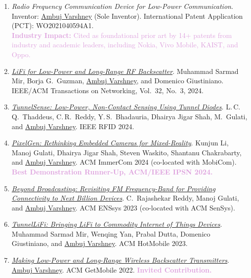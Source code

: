 \begin{enumerate}[itemsep=1.2em, topsep=0.6em]
\item
\emph{Radio Frequency Communication Device for Low-Power Communication}.
Inventor: \underline{Ambuj Varshney} (Sole Inventor).
\textcolor{accent}{International Patent Application (PCT): WO2021040594A1}.\\
\textcolor{plum}{\textbf{Industry Impact:} Cited as foundational prior art by 14+ patents from industry and academic leaders, including Nokia, Vivo Mobile, KAIST, and Oppo.}

\item
\emph{\href{https://doi.org/10.1109/TNET.2023.3344316}{LiFi for Low-Power and Long-Range RF Backscatter}}.
Muhammad Sarmad Mir, Borja G.\ Guzman, \underline{Ambuj Varshney}, and Domenico Giustiniano.
\textcolor{accent}{IEEE/ACM Transactions on Networking, Vol.\ 32, No.\ 3, 2024}.

\item
\emph{\href{https://doi.org/10.1109/RFID62091.2024.10582671}{TunnelSense: Low-Power, Non-Contact Sensing Using Tunnel Diodes}}.
L.\,C.\,Q.\ Thaddeus\ug, C.\,R.\ Reddy\phd, Y.\,S.\ Bhadauria\ug, Dhairya Jigar Shah\phd, M.\ Gulati\postdoc, and \underline{Ambuj Varshney}.
\textcolor{accent}{IEEE RFID 2024}.

\item
\emph{\href{https://doi.org/10.1145/3636534.3696216}{PixelGen: Rethinking Embedded Cameras for Mixed-Reality}}.
Kunjun Li\ug, Manoj Gulati\postdoc, Dhairya Jigar Shah\phd, Steven Waskito\ug, Shantanu Chakrabarty, and \underline{Ambuj Varshney}.
\textcolor{accent}{ACM ImmerCom 2024 (co-located with MobiCom)}.\\
\textcolor{plum}{\textbf{Best Demonstration Runner-Up, ACM/IEEE IPSN 2024.}}

\item
\emph{\href{https://doi.org/10.1145/3628353.3628546}{Beyond Broadcasting: Revisiting FM Frequency-Band for Providing Connectivity to Next Billion Devices}}.
C.\ Rajashekar Reddy\phd, Manoj Gulati\postdoc, and \underline{Ambuj Varshney}.
\textcolor{accent}{ACM ENSsys 2023 (co-located with ACM SenSys)}.

\item
\emph{\href{https://dl.acm.org/doi/10.1145/3572864.3580327}{TunnelLiFi: Bringing LiFi to Commodity Internet of Things Devices}}.
Muhammad Sarmad Mir, Wenqing Yan\phd, Prabal Dutta, Domenico Giustiniano, and \underline{Ambuj Varshney}.
\textcolor{accent}{ACM HotMobile 2023}.

\item
\emph{\href{https://doi.org/10.1145/3551670.3551672}{Making Low-Power and Long-Range Wireless Backscatter Transmitters}}.
\underline{Ambuj Varshney}.
\textcolor{accent}{ACM GetMobile 2022}.
\textcolor{plum}{\textbf{Invited Contribution.}}


\end{enumerate}
